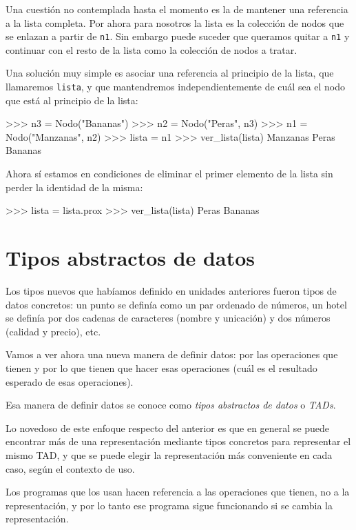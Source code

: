 Una cuestión no contemplada hasta el momento es la de mantener una referencia
a la lista completa. Por ahora para nosotros la lista es la colección de nodos
que se enlazan a partir de \lstinline|n1|. Sin embargo puede suceder que queramos
quitar a \lstinline|n1| y continuar con el resto de la lista como la colección de
nodos a tratar.

Una solución muy simple es asociar una referencia al principio de la lista,
que llamaremos \lstinline|lista|, y que mantendremos independientemente de cuál sea
el nodo que está al principio de la lista:

\begin{codigo-python-sn}
>>> n3 = Nodo("Bananas")
>>> n2 = Nodo("Peras", n3)
>>> n1 = Nodo("Manzanas", n2)
>>> lista = n1
>>> ver_lista(lista)
Manzanas
Peras
Bananas
\end{codigo-python-sn}

Ahora sí estamos en condiciones de eliminar el primer elemento de la lista
sin perder la identidad de la misma:

\begin{codigo-python-sn}
>>> lista = lista.prox
>>> ver_lista(lista)
Peras
Bananas
\end{codigo-python-sn}

\section{Tipos abstractos de datos}

Los tipos nuevos que habíamos definido en unidades anteriores fueron tipos de
datos concretos: un punto se definía como un par ordenado de números, un hotel
se definía por dos cadenas de caracteres (nombre y unicación) y dos números
(calidad y precio), etc.

Vamos a ver ahora una nueva manera de definir datos: por las
operaciones que tienen y por lo que tienen que hacer esas
operaciones (cuál es el resultado esperado de esas operaciones).

Esa manera de definir datos se conoce como {\it tipos abstractos de datos} o
{\it TADs}.

Lo novedoso de este enfoque respecto del anterior es que en general se puede
encontrar más de una representación mediante tipos concretos para representar
el mismo TAD, y que se puede elegir la representación más conveniente en cada
caso, según el contexto de uso.

Los programas que los usan hacen referencia a las operaciones que tienen, no a
la representación, y por lo tanto ese programa sigue funcionando si se cambia
la representación.

